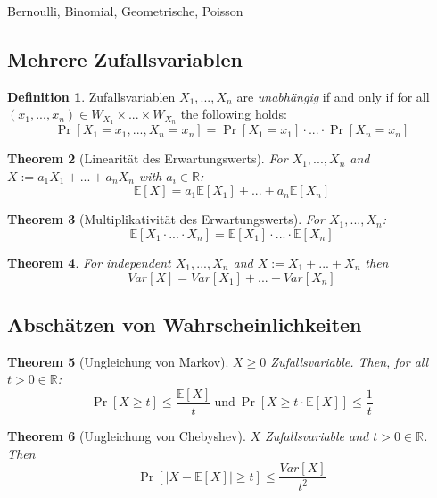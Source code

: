 \documentclass[12pt]{extarticle}
\theoremstyle{definition}
\newtheorem{definition}{Definition}[section]
\theoremstyle{remark}
\theoremstyle{plain}
\newtheorem{theorem}[definition]{Theorem}
\theoremstyle{plain}
\theoremstyle{plain}
\newcommand{\E}{\mathbb{E}}
\begin{document}
Bernoulli, Binomial, Geometrische, Poisson

\subsection{Mehrere Zufallsvariablen}

\begin{definition}
    Zufallsvariablen $X_1, ..., X_n$ are \textit{unabhängig} if and only if
    for all $(x_1, ..., x_n) \in W_{X_1} \times ... \times W_{X_n}$ the following holds:
    \[ \Pr[X_1 = x_1, ..., X_n = x_n] = \Pr[X_1 = x_1] \cdot ... \cdot \Pr[X_n = x_n] \]
\end{definition}

\begin{theorem}[Linearität des Erwartungswerts]
    For $X_1, ..., X_n$ and $X := a_1 X_1 + ... + a_n X_n$ with $a_i \in \mathbb{R}$:
    \[ \E[X] = a_1 \E[X_1] + ... + a_n \E[X_n] \]
\end{theorem}

\begin{theorem}[Multiplikativität des Erwartungswerts]
    For $X_1, ..., X_n$:
    \[ \E[X_1 \cdot ... \cdot X_n] = \E[X_1] \cdot ... \cdot \E[X_n] \]
\end{theorem}

\begin{theorem}
    For independent $X_1, ..., X_n$ and $X := X_1 + ... + X_n$ then
    \[ Var[X] = Var[X_1] + ... + Var[X_n] \]
\end{theorem}

\subsection{Abschätzen von Wahrscheinlichkeiten}

\begin{theorem}[Ungleichung von Markov]
    $X \ge 0$ Zufallsvariable. Then, for all $t > 0 \in \mathbb{R}$:
    \[ \Pr[X \ge t] \le \frac{\E[X]}{t}\ \mbox{und}\ \Pr[X \ge t \cdot \E[X]] \le \frac{1}{t} \]
\end{theorem}

\begin{theorem}[Ungleichung von Chebyshev]
    $X$ Zufallsvariable and $t > 0 \in \mathbb{R}$. Then
    \[ \Pr[|X - \E[X]| \ge t] \le \frac{Var[X]}{t^2} \]
\end{theorem}
\end{document}
